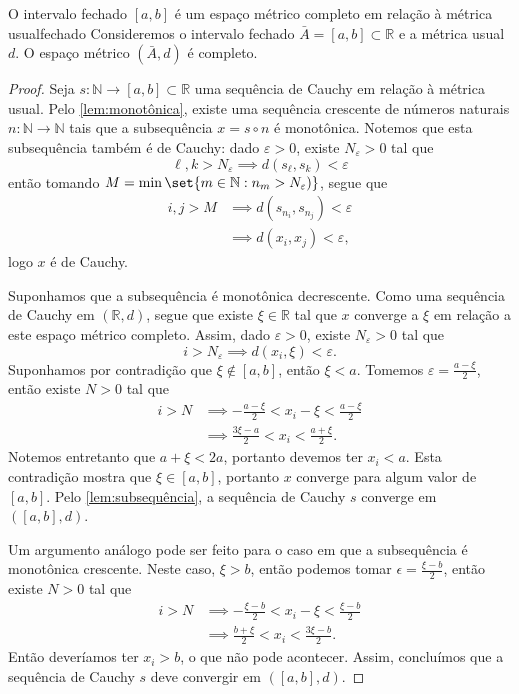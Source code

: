 \begin{proposition}{O intervalo fechado \([a,b]\) é um espaço métrico completo em relação à métrica usual}{fechado}
    Consideremos o intervalo fechado \(\bar{A} = [a,b] \subset \mathbb{R}\) e a métrica usual \(d\). O espaço métrico \((\bar{A}, d)\) é completo.
\end{proposition}
\begin{proof}
    Seja \(s : \mathbb{N} \to [a,b] \subset \mathbb{R}\) uma sequência de Cauchy em relação à métrica usual. Pelo \cref{lem:monotônica}, existe uma sequência crescente de números naturais \(n : \mathbb{N} \to \mathbb{N}\) tais que a subsequência \(x = s \circ n\) é monotônica. Notemos que esta subsequência também é de Cauchy: dado \(\varepsilon > 0\), existe \(N_{\varepsilon} > 0\) tal que
    \begin{equation*}
        \ell,k > N_{\varepsilon} \implies d(s_\ell, s_k) < \varepsilon
    \end{equation*}
    então tomando \(M = \min\set{m \in \mathbb{N} : n_m > N_{\varepsilon})}\), segue que
    \begin{align*}
        i,j > M &\implies d(s_{n_i},s_{n_j}) < \varepsilon\\
                &\implies d(x_i, x_j) < \varepsilon,
    \end{align*}
    logo \(x\) é de Cauchy.

    Suponhamos que a subsequência é monotônica decrescente. Como uma sequência de Cauchy em \((\mathbb{R}, d)\), segue que existe \(\xi \in \mathbb{R}\) tal que \(x\) converge a \(\xi\) em relação a este espaço métrico completo. Assim, dado \(\varepsilon > 0\), existe \(N_{\varepsilon} > 0\) tal que
    \begin{equation*}
        i > N_{\varepsilon} \implies d(x_i, \xi) < \varepsilon.
    \end{equation*}
    Suponhamos por contradição que \(\xi \notin [a,b]\), então \(\xi < a\). Tomemos \(\varepsilon = \frac{a - \xi}2\), então existe \(N > 0\) tal que
    \begin{align*}
        i > N &\implies - \frac{a - \xi}2 < x_i - \xi < \frac{a - \xi}2\\
              &\implies \frac{3\xi - a}2 < x_i < \frac{a + \xi}2.
    \end{align*}
    Notemos entretanto que \(a + \xi < 2a\), portanto devemos ter \(x_i < a\). Esta contradição mostra que \(\xi \in [a,b]\), portanto \(x\) converge para algum valor de \([a,b]\). Pelo \cref{lem:subsequência}, a sequência de Cauchy \(s\) converge em \(([a,b],d)\).

    Um argumento análogo pode ser feito para o caso em que a subsequência é monotônica crescente. Neste caso, \(\xi > b\), então podemos tomar \(\epsilon = \frac{\xi - b}{2}\), então existe \(N > 0\) tal que
    \begin{align*}
        i > N &\implies - \frac{\xi - b}2 < x_i - \xi < \frac{\xi - b}2\\
              &\implies \frac{b + \xi}2 < x_i < \frac{3\xi - b}2.
    \end{align*}
    Então deveríamos ter \(x_i > b\), o que não pode acontecer. Assim, concluímos que a sequência de Cauchy \(s\) deve convergir em \(([a,b],d)\).
\end{proof}
